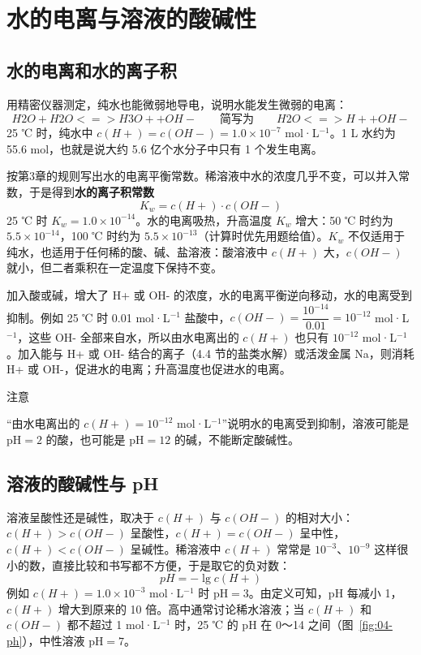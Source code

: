 \documentclass[UTF8,a4paper,zihao=5,oneside,openany,fontset=none]{ctexbook}
\def\heiti{\CJKfamily{zhhei}}
\def\mathrm#1{#1}\def\text#1{#1}\def\ensuremath#1{#1}\def\ce#1{#1}%
\newcommand{\textheading}[2]{\par\addvspace{.6em}\Needspace{4\baselineskip}\noindent
 {\heiti\if\relax\detokenize{#2}\relax #1\else #2\fi}\par\nobreak\smallskip\nobreak\color{black}\ignorespaces}
\newenvironment{yicuo}[1][]{\textheading{注意}{#1}}{\par\smallskip}
\begin{document}
\section{水的电离与溶液的酸碱性}

\subsection{水的电离和水的离子积}
用精密仪器测定，纯水也能微弱地导电，说明水能发生微弱的电离：
\[\ce{H2O + H2O <=> H3O+ + OH-}\qquad\text{简写为}\qquad\ce{H2O <=> H+ + OH-}\]
25 ℃ 时，纯水中 $c(\ce{H+})=c(\ce{OH-})=1.0\times10^{-7}$ mol·L$^{-1}$。1 L 水约为 55.6 mol，也就是说大约 5.6 亿个水分子中只有 1 个发生电离。

按第3章的规则写出水的电离平衡常数。稀溶液中水的浓度几乎不变，可以并入常数，于是得到\textbf{水的离子积常数}
\[K_\text{w}=c(\ce{H+})\cdot c(\ce{OH-})\]
25 ℃ 时 $K_\text{w}=1.0\times10^{-14}$。水的电离吸热，升高温度 $K_\text{w}$ 增大：50 ℃ 时约为 $5.5\times10^{-14}$，100 ℃ 时约为 $5.5\times10^{-13}$（计算时优先用题给值）。$K_\text{w}$ 不仅适用于纯水，也适用于任何稀的酸、碱、盐溶液：酸溶液中 $c(\ce{H+})$ 大，$c(\ce{OH-})$ 就小，但二者乘积在一定温度下保持不变。

加入酸或碱，增大了 \ce{H+} 或 \ce{OH-} 的浓度，水的电离平衡逆向移动，水的电离受到抑制。例如 25 ℃ 时 0.01 mol·L$^{-1}$ 盐酸中，$c(\ce{OH-})=\dfrac{10^{-14}}{0.01}=10^{-12}$ mol·L$^{-1}$，这些 \ce{OH-} 全部来自水，所以由水电离出的 $c(\ce{H+})$ 也只有 $10^{-12}$ mol·L$^{-1}$。加入能与 \ce{H+} 或 \ce{OH-} 结合的离子（4.4 节的盐类水解）或活泼金属 Na，则消耗 \ce{H+} 或 \ce{OH-}，促进水的电离；升高温度也促进水的电离。

\begin{yicuo}
“由水电离出的 $c(\ce{H+})=10^{-12}$ mol·L$^{-1}$”说明水的电离受到抑制，溶液可能是 pH$=2$ 的酸，也可能是 pH$=12$ 的碱，不能断定酸碱性。
\end{yicuo}

\subsection{溶液的酸碱性与 pH}
溶液呈酸性还是碱性，取决于 $c(\ce{H+})$ 与 $c(\ce{OH-})$ 的相对大小：$c(\ce{H+})>c(\ce{OH-})$ 呈酸性，$c(\ce{H+})=c(\ce{OH-})$ 呈中性，$c(\ce{H+})<c(\ce{OH-})$ 呈碱性。稀溶液中 $c(\ce{H+})$ 常常是 $10^{-3}$、$10^{-9}$ 这样很小的数，直接比较和书写都不方便，于是取它的负对数：
\[\mathrm{pH}=-\lg c(\ce{H+})\]
例如 $c(\ce{H+})=1.0\times10^{-3}$ mol·L$^{-1}$ 时 pH$=3$。由定义可知，pH 每减小 1，$c(\ce{H+})$ 增大到原来的 10 倍。高中通常讨论稀水溶液；当 $c(\ce{H+})$ 和 $c(\ce{OH-})$ 都不超过 1 mol·L$^{-1}$ 时，25 ℃ 的 pH 在 0～14 之间（图~\ref{fig:04-ph}），中性溶液 pH$=7$。
\end{document}
